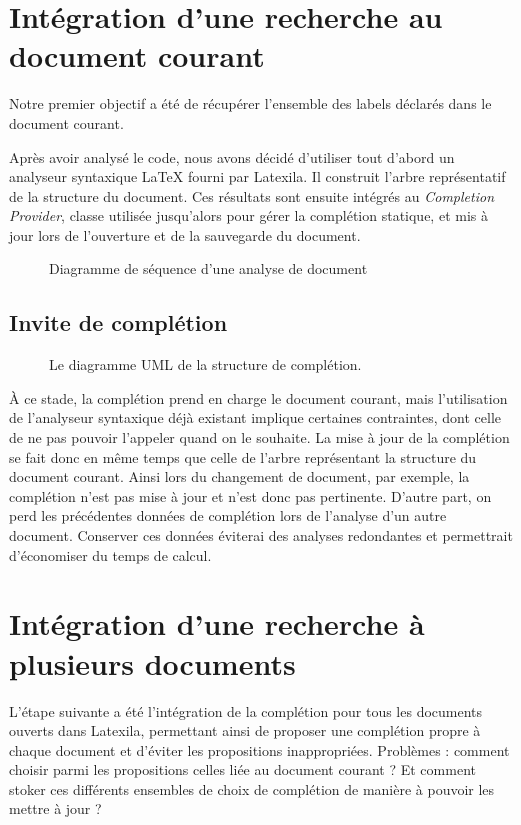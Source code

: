 \documentclass[a4paper,11pt]{report}
\begin{document}
\section{Intégration d'une recherche au document courant}
Notre premier objectif a été de récupérer l'ensemble des labels déclarés dans le document courant.

Après avoir analysé le code, nous avons décidé d'utiliser tout d'abord un analyseur syntaxique \LaTeX{} fourni par Latexila. Il construit l'arbre représentatif de la structure du document.
Ces résultats sont ensuite intégrés au \textit{Completion Provider}, classe utilisée jusqu'alors pour gérer la complétion statique, et mis à jour lors de l'ouverture et de la sauvegarde du document.

\begin{figure}[h]
\label{fig:doc_opening}
\centering

\caption{Diagramme de séquence d'une analyse de document}
\end{figure}

\subsection{Invite de complétion}
\begin{figure}[h!]
\label{fig:uml_completion_structure}
\centering

\caption{Le diagramme UML de la structure de complétion.}
\end{figure}

À ce stade, la complétion prend en charge le document courant, mais l'utilisation de l'analyseur syntaxique déjà existant implique certaines contraintes, dont celle de ne pas pouvoir l'appeler quand on le souhaite.
La mise à jour de la complétion se fait donc en même temps que celle de l'arbre représentant la structure du document courant. 
Ainsi lors du changement de document, par exemple, la complétion n'est pas mise à jour et n'est donc pas pertinente.
D'autre part, on perd les précédentes données de complétion lors de l'analyse d'un autre document.
Conserver ces données éviterai des analyses redondantes et permettrait d'économiser du temps de calcul.

\section{Intégration d'une recherche à plusieurs documents}
L'étape suivante a été l'intégration de la complétion pour tous les documents ouverts dans Latexila, permettant ainsi de proposer une complétion propre à chaque document et d'éviter les propositions inappropriées.
Problèmes : comment choisir parmi les propositions celles liée au document courant ? Et comment stoker ces différents ensembles de choix de complétion de manière à pouvoir les mettre à jour ?
\end{document}
